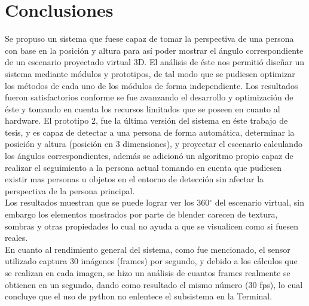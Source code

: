 \documentclass[a4paper,openright,12pt]{report}
\begin{document}
\chapter{Conclusiones}\label{cap.conclusiones}
Se propuso un sistema que fuese capaz de tomar la perspectiva de una persona con base en la posición y altura para así poder mostrar el ángulo correspondiente de un escenario proyectado virtual 3D. El análisis de éste nos permitió diseñar un sistema mediante módulos y prototipos, de tal modo que se pudiesen optimizar los métodos de cada uno de los módulos de forma independiente. Los resultados fueron satisfactorios conforme se fue avanzando el desarrollo y optimización de éste y tomando en cuenta los recursos limitados que se poseen en cuanto al hardware. El prototipo 2, fue la última versión del sistema en éste trabajo de tesis, y es capaz de detectar a una persona de forma automática, determinar la posición y altura (posición en 3 dimensiones), y proyectar el escenario calculando los ángulos correspondientes, además se adicionó un algoritmo propio capaz de realizar el seguimiento a la persona actual tomando en cuenta que pudiesen existir mas personas u objetos en el entorno de detección sin afectar la perspectiva de la persona principal.\\
Los resultados muestran que se puede lograr ver los 360$^{\circ}$ del escenario virtual, sin embargo los elementos mostrados por parte de blender carecen de textura, sombras y otras propiedades lo cual no ayuda a que se visualicen como si fuesen reales.\\
En cuanto al rendimiento general del sistema, como fue mencionado, el sensor utilizado captura 30 imágenes (frames) por segundo, y debido a los cálculos que se realizan en cada imagen, se hizo un análisis de cuantos frames realmente se obtienen en un segundo, dando como resultado el mismo número (30 fps), lo cual concluye que el uso de python no enlentece el subsistema en la Terminal.\\
\end{document}
